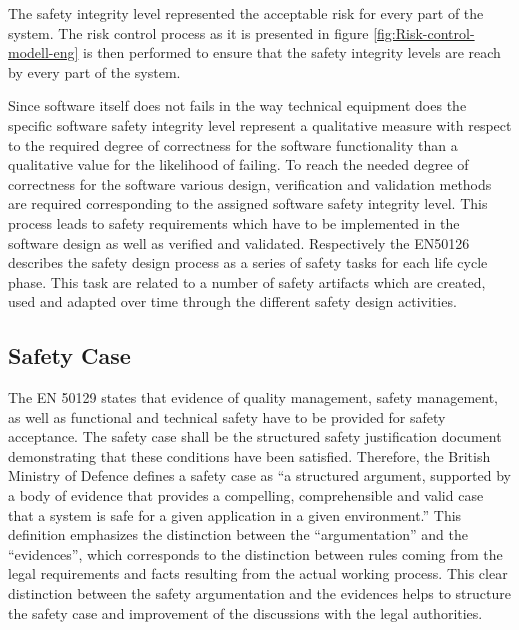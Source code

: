 \documentclass{template/openetcs_report}
\begin{document}
The safety integrity level represented the acceptable risk for every part of the system. The risk control process as it is presented in figure \ref{fig:Risk-control-modell-eng} is then performed to ensure that the safety integrity levels are reach by every part of the system.

Since software itself does not fails in the way technical equipment does the specific software safety integrity level represent a qualitative measure with respect to the required degree of correctness for the software functionality than a qualitative value for the likelihood of failing. To reach the needed degree of correctness for the software various design, verification and validation methods are required corresponding to the assigned software safety integrity level. This process leads to safety requirements which have to be implemented in the software design as well as verified and validated. Respectively the EN50126 describes the safety design process as a series of safety tasks for each life cycle phase. This task are related to a number of safety artifacts which are created, used and adapted over time through the different safety design activities.


\subsection{Safety Case}

The EN 50129 states that evidence of quality management, safety management, as well as functional and technical safety have to be provided for safety acceptance. The safety case shall be the structured safety justification document demonstrating that these conditions have been satisfied.
Therefore, the British Ministry of Defence defines a safety case as “a structured argument, supported by a body of evidence that provides a compelling, comprehensible and valid case that a system is safe for a given application in a given environment.”\cite{MinistryofDefence.2005} This definition emphasizes the distinction between the “argumentation” and the “evidences”, which corresponds to the distinction between rules coming from the legal requirements and facts resulting from the actual working process. This clear distinction between the safety argumentation and the evidences helps to structure the safety case and improvement of the discussions with the legal authorities.\cite{Müller.2010}

\end{document}
